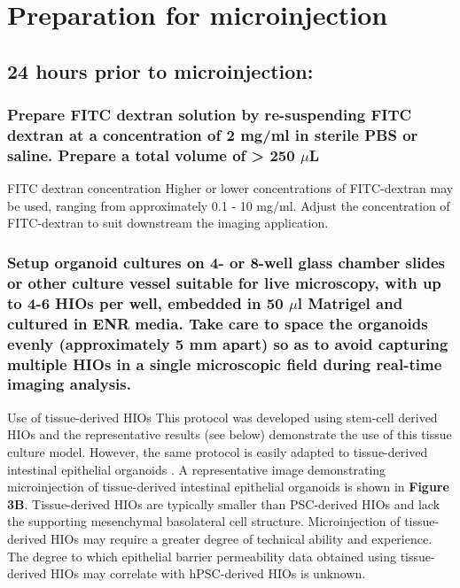 \documentclass[11pt]{article}
\begin{document}
\section{{\sffamily } Preparation for microinjection}
\label{sec:orgheadline41}

\subsection{{\sffamily } 24 hours prior to microinjection:}
\label{sec:orgheadline14}
\subsubsection{{\sffamily } Prepare FITC dextran solution by re-suspending FITC dextran at a concentration of 2 mg/ml in sterile PBS or saline. Prepare a total volume of > 250 \(\mu\)L}
\label{sec:orgheadline11}
\begin{bclogo}[logo=\bcinfo, couleurBarre=Black, noborder=true, couleur=gray!10]{     FITC dextran concentration}
Higher or lower concentrations of FITC-dextran may be used, ranging from approximately 0.1 - 10 mg/ml. Adjust the concentration of FITC-dextran to suit downstream the imaging application.\\
\end{bclogo}

\subsubsection{{\sffamily } Setup organoid cultures on 4- or 8-well glass chamber slides or other culture vessel suitable for live microscopy, with up to 4-6 HIOs per well, embedded in 50 \(\mu\)l Matrigel and cultured in ENR media. Take care to space the organoids evenly (approximately 5 mm apart) so as to avoid capturing multiple HIOs in a single microscopic field during real-time imaging analysis.}
\label{sec:orgheadline12}
\begin{bclogo}[logo=\bcinfo, couleurBarre=Black, noborder=true, couleur=gray!10]{     Use of tissue-derived HIOs}
This protocol was developed using stem-cell derived HIOs and the representative results (see below) demonstrate the use of this tissue culture model. However, the same protocol is easily adapted to tissue-derived intestinal epithelial organoids \supercite{Sato:2009,Miyoshi:2013}. A representative image demonstrating microinjection of tissue-derived intestinal epithelial organoids is shown in \textbf{Figure 3B}. Tissue-derived HIOs are typically smaller than PSC-derived HIOs and lack the supporting mesenchymal basolateral cell structure\supercite{Sato:2009,Miyoshi:2013,Sato:2011}. Microinjection of tissue-derived HIOs may require a greater degree of technical ability and experience. The degree to which epithelial barrier permeability data obtained using tissue-derived HIOs may correlate with hPSC-derived HIOs is unknown.\\
\end{bclogo}
\end{document}
